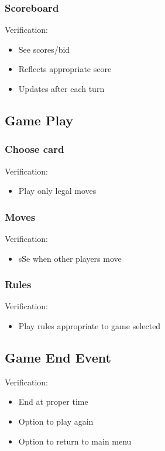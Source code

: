 \documentclass[11pt, titlepage]{article}
\begin{document}
			\subsubsection{Scoreboard}
			Verification:
			\begin{itemize}
				\item See scores/bid
				\item Reflects appropriate score
				\item Updates after each turn
			\end{itemize}
			
		\subsection{Game Play}
			\subsubsection{Choose card}
			Verification:
				\begin{itemize}	
					\item Play only legal moves
				\end{itemize}
			\subsubsection{Moves}
			Verification:
			\begin{itemize}
				\item 	sSe when other players move
			\end{itemize}
		
			\subsubsection{Rules}
			Verification:
			\begin{itemize}
				\item Play rules appropriate to game selected	
			\end{itemize}
		
		\subsection{Game End Event}
			Verification:
			\begin{itemize}
				\item End at proper time
				\item Option to play again
				\item Option to return to main menu
			\end{itemize}
\end{document}
